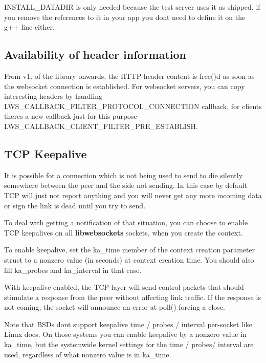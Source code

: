 {\ttfamily I\+N\+S\+T\+A\+L\+L\+\_\+\+D\+A\+T\+A\+D\+IR} is only needed because the test server uses it as shipped, if you remove the references to it in your app you don\textquotesingle{}t need to define it on the g++ line either.

\subsection*{Availability of header information }

From v1. of the library onwards, the H\+T\+TP header content is {\ttfamily free()}d as soon as the websocket connection is established. For websocket servers, you can copy interesting headers by handling {\ttfamily L\+W\+S\+\_\+\+C\+A\+L\+L\+B\+A\+C\+K\+\_\+\+F\+I\+L\+T\+E\+R\+\_\+\+P\+R\+O\+T\+O\+C\+O\+L\+\_\+\+C\+O\+N\+N\+E\+C\+T\+I\+ON} callback, for clients there\textquotesingle{}s a new callback just for this purpose {\ttfamily L\+W\+S\+\_\+\+C\+A\+L\+L\+B\+A\+C\+K\+\_\+\+C\+L\+I\+E\+N\+T\+\_\+\+F\+I\+L\+T\+E\+R\+\_\+\+P\+R\+E\+\_\+\+E\+S\+T\+A\+B\+L\+I\+SH}.

\subsection*{T\+CP Keepalive }

It is possible for a connection which is not being used to send to die silently somewhere between the peer and the side not sending. In this case by default T\+CP will just not report anything and you will never get any more incoming data or sign the link is dead until you try to send.

To deal with getting a notification of that situation, you can choose to enable T\+CP keepalives on all {\bfseries libwebsockets} sockets, when you create the context.

To enable keepalive, set the ka\+\_\+time member of the context creation parameter struct to a nonzero value (in seconds) at context creation time. You should also fill ka\+\_\+probes and ka\+\_\+interval in that case.

With keepalive enabled, the T\+CP layer will send control packets that should stimulate a response from the peer without affecting link traffic. If the response is not coming, the socket will announce an error at {\ttfamily poll()} forcing a close.

Note that B\+S\+Ds don\textquotesingle{}t support keepalive time / probes / interval per-\/socket like Linux does. On those systems you can enable keepalive by a nonzero value in {\ttfamily ka\+\_\+time}, but the systemwide kernel settings for the time / probes/ interval are used, regardless of what nonzero value is in {\ttfamily ka\+\_\+time}.

